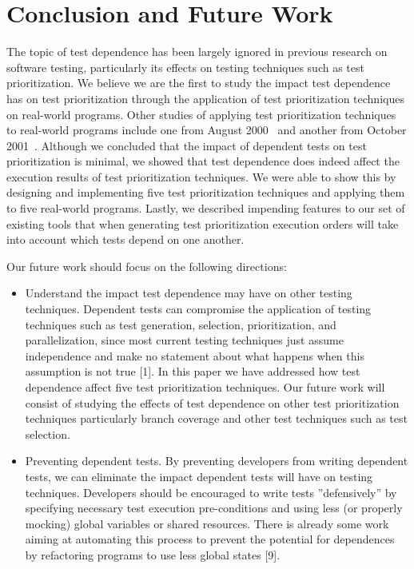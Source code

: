 \section{Conclusion and Future Work}

The topic of test dependence has been largely ignored in previous research on software testing, particularly its effects on testing techniques such as test prioritization. We believe we are the first to study the impact test dependence has on test prioritization through the application of test prioritization techniques on real-world programs. Other studies of applying test prioritization techniques to real-world programs include one from August 2000~\cite{} and another from October 2001~\cite{}. Although we concluded that the impact of dependent tests on test prioritization is minimal, we showed that test dependence does indeed affect the execution results of test prioritization techniques. We were able to show this by designing and implementing five test prioritization techniques and applying them to five real-world programs. Lastly, we described impending features to our set of existing tools that when generating test prioritization execution orders will take into account which tests depend on one another. 

Our future work should focus on the following directions:
\begin{itemize}
\item Understand the impact test dependence may have on other testing techniques. Dependent tests can compromise the application of testing techniques such as test generation, selection, prioritization, and parallelization, since most current testing techniques just assume independence and make no statement about what happens when this assumption is not true [1]. In this paper we have addressed how test dependence affect five test prioritization techniques. Our future work will consist of studying the effects of test dependence on other test prioritization techniques particularly branch coverage and other test techniques such as test selection. 
\item Preventing dependent tests. By preventing developers from writing dependent tests, we can eliminate the impact dependent tests will have on testing techniques. Developers should be encouraged to write tests ''defensively'' by specifying necessary test execution pre-conditions and using less (or properly mocking) global variables or shared resources. There is already some work aiming at automating this process to prevent the potential for dependences by refactoring programs to use less global states [9].
\end{itemize}

